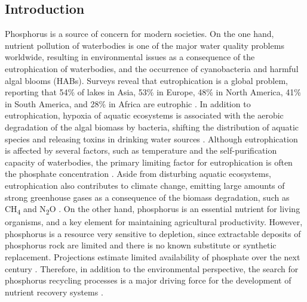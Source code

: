 \begin{refsection}[referencesCh4]
\section{Introduction}
Phosphorus is a source of concern for modern societies. On the one hand, nutrient pollution of waterbodies is one of the major water quality problems worldwide, resulting in environmental issues as a consequence of the eutrophication of waterbodies, and the occurrence of cyanobacteria and harmful algal blooms (HABs). Surveys reveal that eutrophication is a global problem, reporting that 54\% of lakes in Asia, 53\% in Europe, 48\% in North America, 41\% in South America, and 28\% in Africa are eutrophic \citep{ansari_eutrophication_2010}. In addition to eutrophication, hypoxia of aquatic ecosystems is associated with the aerobic degradation of the algal biomass by bacteria, shifting the distribution of aquatic species and releasing toxins in drinking water sources \citep{sampat_economic_2018}. Although eutrophication is affected by several factors, such as temperature and the self-purification capacity of waterbodies, the primary limiting factor for eutrophication is often the phosphate concentration \citep{Ullmanns}. Aside from disturbing aquatic ecosystems, eutrophication also contributes to climate change, emitting large amounts of strong greenhouse gases as a consequence of the biomass degradation, such as CH\textsubscript{4} and N\textsubscript{2}O \citep{beaulieu_eutrophication_2019}. On the other hand, phosphorus is an essential nutrient for living organisms, and a key element for maintaining agricultural productivity. However, phosphorus is a resource very sensitive to depletion, since extractable deposits of phosphorus rock are limited and there is no known substitute or synthetic replacement. Projections estimate limited availability of phosphate over the next century \citep{cordell_story_2009}. Therefore, in addition to the environmental perspective, the search for phosphorus recycling processes is a major driving force for the development of nutrient recovery systems \citep{reijnders2014phosphorus}.


\end{refsection}
